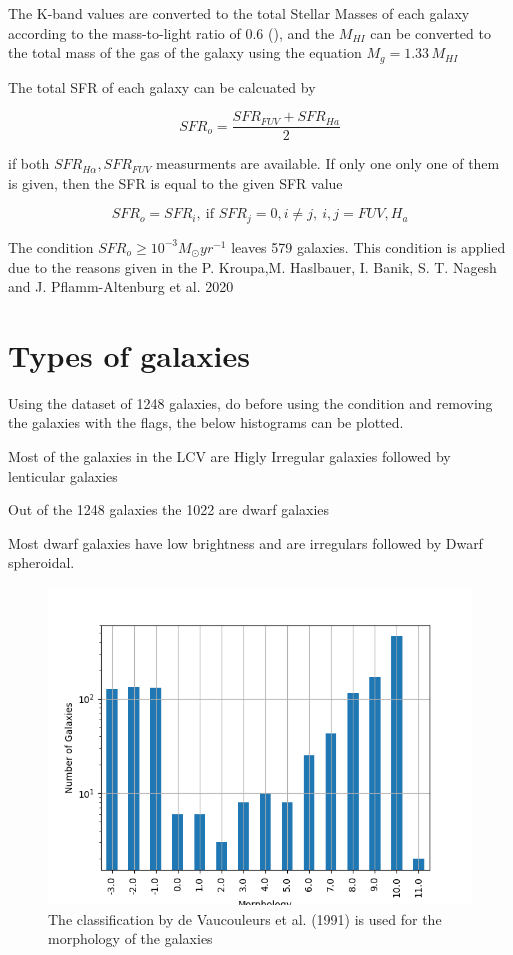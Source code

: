 \documentclass[a4paper,twocolumn]{article}
\begin{document}
The K-band values are converted to the total Stellar Masses of each galaxy according to the mass-to-light ratio of 0.6 (\cite{lelliSPARCMASSMODELS2016}), and the \(M_{HI}\) can be converted to the total mass of the gas of the galaxy using the equation \(M_g=1.33\,M_{HI}\)

The total SFR of each galaxy can be calcuated by

$$
    SFR_o=\frac{SFR_{FUV}+SFR_{Ha}}{2}
$$

if both \(SFR_{H\alpha},SFR_{FUV}\) measurments are available. If only one only one of them is given, then the SFR is equal to the given SFR value

$$
    SFR_o=SFR_i,\ \text{if } SFR_j=0,i\neq j,\ i,j=FUV, H_a
$$

The condition \(SFR_o\geq 10^{-3}M_\odot yr^{-1}\) leaves 579
galaxies. This condition is applied due to the reasons given in the P. Kroupa,M. Haslbauer, I. Banik, S. T. Nagesh and J. Pflamm-Altenburg et al. 2020 \cite{kroupaConstraintsStarFormation2020}

\section{Types of galaxies}
\label{sec:org54aef07}

Using the dataset of 1248 galaxies, do before using the condition and removing the galaxies with the flags, the below histograms can be plotted.

Most of the galaxies in the LCV are Higly Irregular galaxies followed by lenticular galaxies

Out of the 1248 galaxies the 1022 are dwarf galaxies


Most dwarf galaxies have low brightness and are irregulars followed by Dwarf spheroidal.

\begin{figure}[htbp]
\centering
\includegraphics[width=.9\linewidth]{./figs/hist-Type.png}
\caption{\label{Types of galaxies}The classification by de Vaucouleurs et al. (1991) is used for the morphology of the galaxies}
\end{figure}
\end{document}
